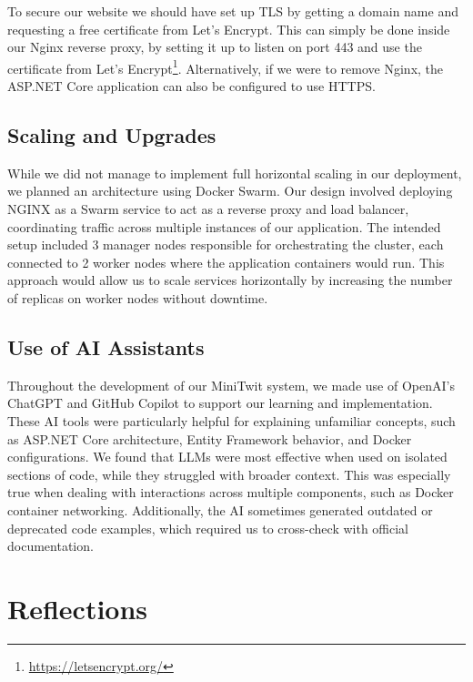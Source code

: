 \documentclass[12pt,a4paper,reqno]{report}
\begin{document}
To secure our website we should have set up TLS by getting a domain name and requesting a free certificate from Let’s Encrypt. This can simply be done inside our Nginx reverse proxy, by setting it up to listen on port 443 and use the certificate from Let’s Encrypt\footnote{\url{https://letsencrypt.org/}}. Alternatively, if we were to remove Nginx, the ASP.NET Core application can also be configured to use HTTPS.

\subsection{Scaling and Upgrades}

While we did not manage to implement full horizontal scaling in our deployment, we planned an architecture using Docker Swarm. Our design involved deploying NGINX as a Swarm service to act as a reverse proxy and load balancer, coordinating traffic across multiple instances of our application. The intended setup included 3 manager nodes responsible for orchestrating the cluster, each connected to 2 worker nodes where the application containers would run. This approach would allow us to scale services horizontally by increasing the number of replicas on worker nodes without downtime.

\subsection{Use of AI Assistants}

Throughout the development of our MiniTwit system, we made use of OpenAI’s ChatGPT and GitHub Copilot to support our learning and implementation. These AI tools were particularly helpful for explaining unfamiliar concepts, such as ASP.NET Core architecture, Entity Framework behavior, and Docker configurations. We found that LLMs were most effective when used on isolated sections of code, while they struggled with broader context. This was especially true when dealing with interactions across multiple components, such as Docker container networking. Additionally, the AI sometimes generated outdated or deprecated code examples, which required us to cross-check with official documentation.

\section{Reflections}
\end{document}
